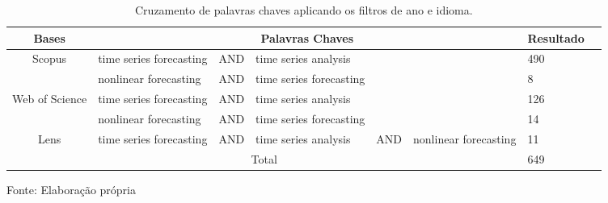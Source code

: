 \begin{table}[!ht]
	\caption{Cruzamento de palavras chaves aplicando os filtros de ano e idioma.}\label{tb1}
	\centering
	\begin{tabular}{@{}cp{2cm}p{1cm}p{2cm}p{1cm}p{2cm}p{2cm}p{2cm}@{}}
		\toprule
		Bases                             & \multicolumn{5}{c}{Palavras Chaves}                                                         & Resultado \\ \midrule
		\multirow{2}{*}{Scopus}           & time   series forecasting & AND & time   series analysis    &     &                         & 490       \\
		& nonlinear forecasting     & AND & time   series forecasting &     &                         & 8         \\
		\multirow{2}{*}{Web   of Science} & time   series forecasting & AND & time   series analysis    &     &                         & 126       \\
		& nonlinear forecasting     & AND & time   series forecasting &     &                         & 14        \\
		Lens                              & time   series forecasting & AND & time   series analysis    & AND & nonlinear   forecasting & 11        \\
		\multicolumn{6}{c}{Total}                                                                                                       & 649       \\ \bottomrule
	\end{tabular}
	
	
	\vspace{0.2cm}
	Fonte: Elaboração própria
\end{table}